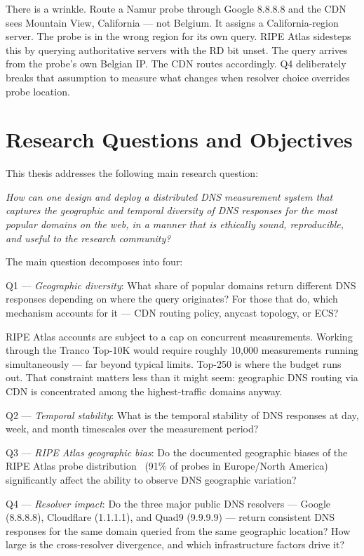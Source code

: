 There is a wrinkle. Route a Namur probe through Google 8.8.8.8 and the \ac{CDN} sees Mountain View, California — not Belgium. It assigns a California-region server. The probe is in the wrong region for its own query. RIPE Atlas sidesteps this by querying authoritative servers with the \ac{RD} bit unset. The query arrives from the probe's own Belgian \ac{IP}. The \ac{CDN} routes accordingly. Q4 deliberately breaks that assumption to measure what changes when resolver choice overrides probe location.

\bigskip
\section{Research Questions and Objectives}
\label{sec:1.3}

This thesis addresses the following main research question:

\textit{How can one design and deploy a distributed \ac{DNS} measurement system that captures the geographic and temporal diversity of \ac{DNS} responses for the most popular domains on the web, in a manner that is ethically sound, reproducible, and useful to the research community?}

The main question decomposes into four:

Q1 --- \textit{Geographic diversity}: What share of popular domains return different \ac{DNS} responses depending on where the query originates? For those that do, which mechanism accounts for it — \ac{CDN} routing policy, anycast topology, or \ac{ECS}?

RIPE Atlas accounts are subject to a cap on concurrent measurements. Working through the Tranco Top-10K would require roughly 10,000 measurements running simultaneously — far beyond typical limits. Top-250 is where the budget runs out. That constraint matters less than it might seem: geographic \ac{DNS} routing via \ac{CDN} is concentrated among the highest-traffic domains anyway.

Q2 --- \textit{Temporal stability}: What is the temporal stability of \ac{DNS} responses at day, week, and month timescales over the measurement period?

Q3 --- \textit{RIPE Atlas geographic bias}: Do the documented geographic biases of the RIPE Atlas probe distribution~\cite{Bajpai2017} (91\% of probes in Europe/North America) significantly affect the ability to observe \ac{DNS} geographic variation?

Q4 --- \textit{Resolver impact}: Do the three major public \ac{DNS} resolvers --- Google (8.8.8.8), Cloudflare (1.1.1.1), and Quad9 (9.9.9.9) --- return consistent \ac{DNS} responses for the same domain queried from the same geographic location? How large is the cross-resolver divergence, and which infrastructure factors drive it?

